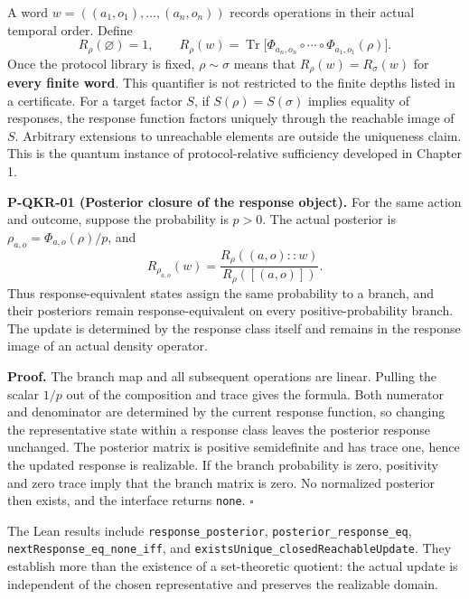 \documentclass[
  11pt,
  oneside]{book}
\begin{document}
A word \(w=((a_1,o_1),\ldots,(a_n,o_n))\) records operations in their
actual temporal order. Define \[
R_\rho(\varnothing)=1,\qquad
R_\rho(w)=\operatorname{Tr}\bigl[\Phi_{a_n,o_n}\circ\cdots\circ\Phi_{a_1,o_1}(\rho)\bigr].
\] Once the protocol library is fixed, \(\rho\sim\sigma\) means that
\(R_\rho(w)=R_\sigma(w)\) for \textbf{every finite word}. This
quantifier is not restricted to the finite depths listed in a
certificate. For a target factor \(S\), if \(S(\rho)=S(\sigma)\) implies
equality of responses, the response function factors uniquely through
the reachable image of \(S\). Arbitrary extensions to unreachable
elements are outside the uniqueness claim. This is the quantum instance
of protocol-relative sufficiency developed in Chapter 1.

\label{p-qkr-01}{}

\textbf{P-QKR-01 (Posterior closure of the response object).} For the
same action and outcome, suppose the probability is \(p>0\). The actual
posterior is \(\rho_{a,o}=\Phi_{a,o}(\rho)/p\), and \[
R_{\rho_{a,o}}(w)=\frac{R_\rho((a,o)::w)}{R_\rho([(a,o)])}.
\] Thus response-equivalent states assign the same probability to a
branch, and their posteriors remain response-equivalent on every
positive-probability branch. The update is determined by the response
class itself and remains in the response image of an actual density
operator.

\textbf{Proof.} The branch map and all subsequent operations are linear.
Pulling the scalar \(1/p\) out of the composition and trace gives the
formula. Both numerator and denominator are determined by the current
response function, so changing the representative state within a
response class leaves the posterior response unchanged. The posterior
matrix is positive semidefinite and has trace one, hence the updated
response is realizable. If the branch probability is zero, positivity
and zero trace imply that the branch matrix is zero. No normalized
posterior then exists, and the interface returns \texttt{none}.
\(\square\)

The Lean results include \texttt{response\_\allowbreak posterior},
\texttt{posterior\_\allowbreak response\_\allowbreak eq}, \texttt{next\allowbreak Response\_\allowbreak eq\_\allowbreak none\_\allowbreak iff},
and \texttt{exists\allowbreak Unique\_\allowbreak closed\allowbreak Reachable\allowbreak Update}. They establish more
than the existence of a set-theoretic quotient: the actual update is
independent of the chosen representative and preserves the realizable
domain.
\end{document}
